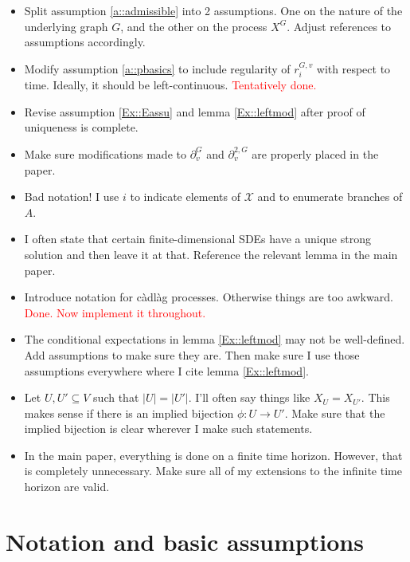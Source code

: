 \documentclass[12pt]{article}
\newcommand{\mc}{\mathcal}
\newcommand{\ra}{\rightarrow}
\newcommand{\tr}{\textcolor{red}}
\newcommand{\sta}{\mc{X}}							%
\newcommand{\gneigh}[2]{\partial^{#1}_{#2}}			%
\newcommand{\dgneigh}[2]{\partial^{2,#1}_{#2}}		%
\newcommand{\Xf}{X}									%
\newcommand{\rate}{r}								%
\newcommand{\vind}[1]{_{#1}}						%
\newcommand{\gind}[1]{^{#1}}						%
\newcommand{\stpara}[1]{_{#1}}						%
\newcommand{\gvpara}[2]{^{#1,#2}}					%
\begin{document}
\begin{itemize}
\item Split assumption \ref{a::admissible} into 2 assumptions. One on the nature of the underlying graph \(G\), and the other on the process \(\Xf\gind{G}\). Adjust references to assumptions accordingly.

\item Modify assumption \ref{a::pbasics} to include regularity of \(\rate\gvpara{G}{v}\stpara{i}\) with respect to time. Ideally, it should be left-continuous. \tr{Tentatively done.}

\item Revise assumption \ref{Ex::Eassu} and lemma \ref{Ex::leftmod} after proof of uniqueness is complete.

\item Make sure modifications made to \(\gneigh{G}{v}\) and \(\dgneigh{G}{v}\) are properly placed in the paper.

\item Bad notation! I use \(i\) to indicate elements of \(\sta\) and to enumerate branches of \(A\).

\item I often state that certain finite-dimensional SDEs have a unique strong solution and then leave it at that. Reference the relevant lemma in the main paper.

\item Introduce notation for c\`adl\`ag processes. Otherwise things are too awkward. \tr{Done. Now implement it throughout.}

\item The conditional expectations in lemma \ref{Ex::leftmod} may not be well-defined. Add assumptions to make sure they are. Then make sure I use those assumptions everywhere where I cite lemma \ref{Ex::leftmod}.

\item Let \(U,U'\subseteq V\) such that \(|U| = |U'|\). I'll often say things like \(\Xf\vind{U} = \Xf\vind{U'}\). This makes sense if there is an implied bijection \(\phi:U \ra U'\). Make sure that the implied bijection is clear wherever I make such statements.

\item In the main paper, everything is done on a finite time horizon. However, that is completely unnecessary. Make sure all of my extensions to the infinite time horizon are valid.
\end{itemize}


\section{Notation and basic assumptions}
\label{not}
\end{document}
